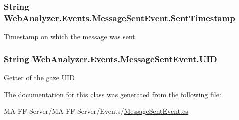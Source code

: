 \subsubsection[{Sent\+Timestamp}]{\setlength{\rightskip}{0pt plus 5cm}String Web\+Analyzer.\+Events.\+Message\+Sent\+Event.\+Sent\+Timestamp\hspace{0.3cm}{\ttfamily [get]}}\label{class_web_analyzer_1_1_events_1_1_message_sent_event_a7408640c7a1d8de43f36ca70b01c49b0}


Timestamp on which the message was sent 

\hypertarget{class_web_analyzer_1_1_events_1_1_message_sent_event_a04217696019822bcc61e6890810b8442}{}
\subsubsection[{U\+I\+D}]{\setlength{\rightskip}{0pt plus 5cm}String Web\+Analyzer.\+Events.\+Message\+Sent\+Event.\+U\+I\+D\hspace{0.3cm}{\ttfamily [get]}}\label{class_web_analyzer_1_1_events_1_1_message_sent_event_a04217696019822bcc61e6890810b8442}


Getter of the gaze U\+I\+D 



The documentation for this class was generated from the following file\+:\begin{DoxyCompactItemize}
\item 
M\+A-\/\+F\+F-\/\+Server/\+M\+A-\/\+F\+F-\/\+Server/\+Events/\hyperlink{_message_sent_event_8cs}{Message\+Sent\+Event.\+cs}\end{DoxyCompactItemize}
